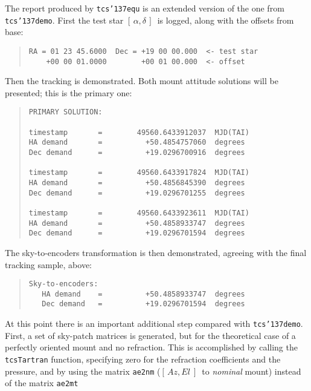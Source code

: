 \documentclass[12pt,fleqn,twoside]{article}
\renewcommand{\_}{{\tt\char'137}}     %
\newcommand{\radec}     {$[\,\alpha,\delta\,]$}
\newcommand{\azel}      {$[\,Az,El~]$}
\begin{document}
The report produced by {\tt tcs\_equ} is an extended version of the
one from {\tt tcs\_demo}.  First the test star \radec\ is logged,
along with the offsets from base:
\begin{quote}
\begin{small}
\begin{verbatim}
RA = 01 23 45.6000  Dec = +19 00 00.000  <- test star
    +00 00 01.0000        +00 01 00.000  <- offset
\end{verbatim}\end{small}
\end{quote}
Then the tracking is demonstrated.  Both mount attitude
solutions will be presented;  this is the primary one:
\begin{quote}
\begin{small}
\begin{verbatim}
PRIMARY SOLUTION:

timestamp       =        49560.6433912037  MJD(TAI)
HA demand       =          +50.4854757060  degrees
Dec demand      =          +19.0296700916  degrees

timestamp       =        49560.6433917824  MJD(TAI)
HA demand       =          +50.4856845390  degrees
Dec demand      =          +19.0296701255  degrees

timestamp       =        49560.6433923611  MJD(TAI)
HA demand       =          +50.4858933747  degrees
Dec demand      =          +19.0296701594  degrees
\end{verbatim}\end{small}
\end{quote}
The sky-to-encoders transformation is then demonstrated, agreeing
with the final tracking sample, above:
\begin{quote}
\begin{small}
\begin{verbatim}
Sky-to-encoders:
   HA demand    =          +50.4858933747  degrees
   Dec demand   =          +19.0296701594  degrees
\end{verbatim}\end{small}
\end{quote}
At this point there is an important additional step compared
with {\tt tcs\_demo}.  First, a set of sky-patch matrices is
generated, but for the theoretical case of a perfectly
oriented mount and no refraction.
This is accomplished by calling the
{\tt tcsTartran} function, specifying zero for the refraction
coefficients and the pressure, and by using the matrix {\tt ae2nm}
(\azel\ to {\it nominal}\/ mount) instead of the matrix {\tt ae2mt}
\end{document}
